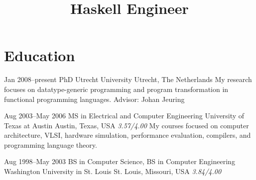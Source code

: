\documentclass[11pt,a4paper,roman]{moderncv}
\title{Haskell Engineer}
\begin{document}
\makecvtitle



\newcommand\seeabovedesc{(\textit{See description above.})}

\newcommand\sanfrancisco{San Francisco, California, USA}
\newcommand\utrecht{Utrecht, The Netherlands}
\newcommand\austin{Austin, Texas, USA}
\newcommand\stlouis{St. Louis, Missouri, USA}
\newcommand\chippewafalls{Chippewa Falls, Wisconsin, USA}
\newcommand\whitemarsh{White Marsh, Maryland, USA}
\newcommand\altamont{Altamont, Tennessee, USA}
\newcommand\chattanooga{Chattanooga, Tennessee, USA}
\newcommand\london{London, UK}
\newcommand\centurion{Centurion, South Africa}
\newcommand\portland{Portland, Oregon, USA}

\newcommand\uu{Utrecht University}
\newcommand\wustl{Washington University in St. Louis}
\newcommand\ut{University of Texas at Austin}



\newcommand\Cpp{C{}\texttt{++}\xspace}


\section{Education}

\cventry%
{Jan 2008--present}%
{PhD}%
{\uu}%
{\utrecht}%
{}%
{My research focuses on datatype-generic programming and program transformation
in functional programming languages.\newline{}%
Advisor: Johan Jeuring}

\cventry%
{Aug 2003--May 2006}%
{MS in Electrical and Computer Engineering}%
{University of Texas at Austin}%
{\austin}%
{\textit{3.57/4.00}}%
{My courses focused on computer architecture, VLSI, hardware simulation,
performance evaluation, compilers, and programming language theory.}

\cventry%
{Aug 1998--May 2003}%
{BS in Computer Science, BS in Computer Engineering}%
{\wustl}%
{\stlouis}%
{\textit{3.84/4.00}}%
{}

\end{document}
